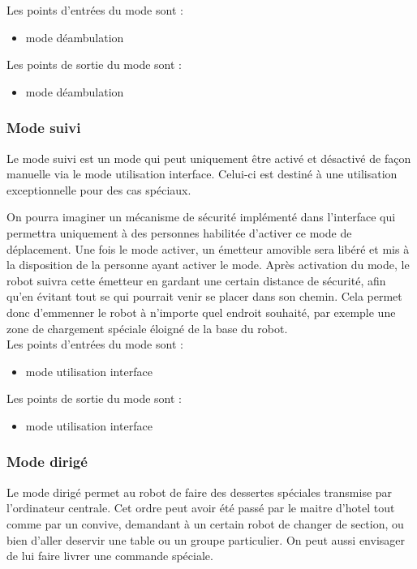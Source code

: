 Les points d'entrées du mode sont :
\begin{itemize}
\item mode déambulation
\end{itemize}

Les points de sortie du mode sont :
\begin{itemize}
\item mode déambulation
\end{itemize}

\subsubsection{Mode suivi}
Le mode suivi est un mode qui peut uniquement être activé et désactivé de façon manuelle via le mode utilisation interface.
Celui-ci est destiné à une utilisation exceptionnelle pour des cas spéciaux.

On pourra imaginer un mécanisme de sécurité implémenté dans l'interface qui permettra uniquement à des personnes habilitée d'activer ce mode de déplacement.
Une fois le mode activer, un émetteur amovible sera libéré et mis à la disposition de la personne ayant activer le mode.
Après activation du mode, le robot suivra cette émetteur en gardant une certain distance de sécurité, afin qu'en évitant tout se qui pourrait venir se placer dans son chemin. Cela permet donc d'emmenner le robot à n'importe quel endroit souhaité, par exemple une zone de chargement spéciale éloigné de la base du robot.\\


Les points d'entrées du mode sont :
\begin{itemize}
\item mode utilisation interface
\end{itemize}

Les points de sortie du mode sont :
\begin{itemize}
\item mode utilisation interface
\end{itemize}

\subsubsection{Mode dirigé}
Le mode dirigé permet au robot de faire des dessertes spéciales transmise par l'ordinateur centrale.
Cet ordre peut avoir été passé par le maitre d'hotel tout comme par un convive, demandant à un certain robot de changer de section, ou bien d'aller deservir une table ou un groupe particulier.
On peut aussi envisager de lui faire livrer une commande spéciale.\\

